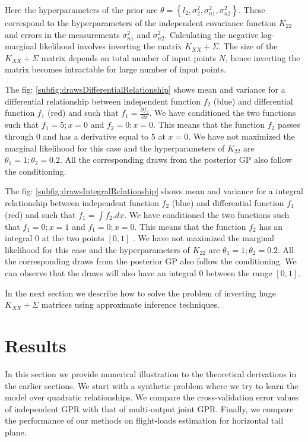 Here the hyperparameters of the prior are \(\theta = \left \{ l_{2}, \sigma_{2}^{2}, \sigma _{n1}^{2}, \sigma _{n2}^{2} \right \}\). These correspond to the hyperparameters of the independent covariance function \(K_{22}\) and errors in the measurements \(\sigma _{n1}^{2}\) and \(\sigma _{n2}^{2}\). Calculating the negative log-marginal likelihood involves inverting the matrix \(K_{XX} + \Sigma\). The size of the \(K_{XX} + \Sigma\) matrix depends on total number of input points \(N\), hence inverting the matrix becomes intractable for large number of input points.    

The fig: \ref{subfig:drawsDifferentialRelationship} shows mean and variance for a differential relationship between independent function \(f_{2}\) (blue) and differential function \(f_{1}\) (red) and such that \(f_{1} = \frac{\partial f_{2}}{\partial x}\). We have conditioned the two functions such that \(f_{1} = 5; x = 0\) and \(f_{2} = 0; x = 0\). This means that the function \(f_{2}\) passes through \(0\) and has a derivative equal to \(5\) at \(x = 0\). We have not maximized the marginal likelihood for this case and the hyperparameters of \(K_{22}\) are \(\theta_{1} = 1; \theta_{2} = 0.2\). All the corresponding draws from the posterior GP also follow the conditioning. 

The fig: \ref{subfig:drawsIntegralRelationship} shows mean and variance for a integral relationship between independent function \(f_{2}\) (blue) and differential function \(f_{1}\) (red) and such that \(f_{1} = \int f_{2} . dx\). We have conditioned the two functions such that \(f_{1} = 0; x = 1\) and \(f_{1} = 0; x = 0\). This means that the function \(f_{2}\) has an integral \(0\) at the two points \([0, 1]\) . We have not maximized the marginal likelihood for this case and the hyperparameters of \(K_{22}\) are \(\theta_{1} = 1; \theta_{2} = 0.2\). All the corresponding draws from the posterior GP also follow the conditioning. We can observe that the draws will also have an integral \(0\) between the range \([0, 1]\).

In the next section we describe how to solve the problem of inverting huge \(K_{XX} + \Sigma\) matrices using approximate inference techniques.

\section{Results}\label{sec:results}
In this section we provide numerical illustration to the theoretical derivations in the earlier sections. We start with a synthetic problem where we try to learn the model over quadratic relationships. We compare the cross-validation error values of independent GPR with that of multi-output joint GPR. Finally, we compare the performance of our methods on flight-loads estimation for horizontal tail plane.

